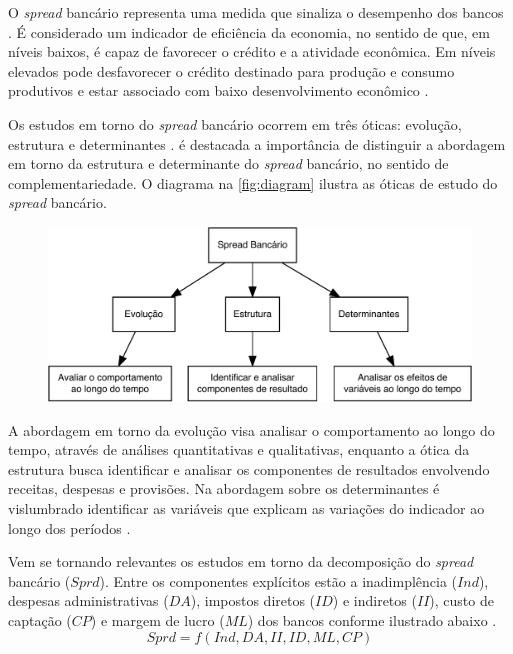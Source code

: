 \documentclass[12pt,12pt,openright,oneside,a4paper,chapter=TITLE,section=TITLE,subsection=TITLE,subsubsection=TITLE,english,french,spanish,portugues,sumario=tradicional]{abntex2}
\begin{document}
O \emph{spread} bancário representa uma medida que sinaliza o desempenho dos bancos \cite{levine:1997}. É considerado um indicador de eficiência da economia, no sentido de que, em níveis baixos, é capaz de favorecer o crédito e a atividade econômica. Em níveis elevados pode desfavorecer o crédito destinado para produção e consumo produtivos e estar associado com baixo desenvolvimento econômico \cite{WB:2005}.

Os estudos em torno do \emph{spread} bancário ocorrem em três óticas: evolução,
estrutura e determinantes \cite{dick:1999}. \textcite{dick:1999} é
destacada a importância de distinguir a abordagem em torno da estrutura e
determinante do \emph{spread} bancário, no sentido de complementariedade. O diagrama
na \autoref{fig:diagram} ilustra as óticas de estudo do \emph{spread} bancário.

\begin{figure}

\begin{center}\includegraphics{12-exportedfigures/diagram.spread.otic-1} \end{center}
\label{fig:diagrama}
\end{figure}

A abordagem em torno da evolução visa analisar o comportamento ao longo do
tempo, através de análises quantitativas e qualitativas, enquanto a ótica da
estrutura busca identificar e analisar os componentes de resultados envolvendo
receitas, despesas e provisões. Na abordagem sobre os determinantes é
vislumbrado identificar as variáveis que explicam as variações do indicador ao
longo dos períodos \cite{dick:1999}.

Vem se tornando relevantes os estudos em torno da decomposição do \emph{spread} bancário (\(Sprd\)). Entre os componentes explícitos estão a inadimplência (\(Ind\)), despesas administrativas (\(DA\)), impostos diretos (\(ID\)) e indiretos (\(II\)), custo de captação (\(CP\)) e margem de lucro (\(ML\)) dos bancos conforme ilustrado abaixo \cite{BCB:2000}.
\[
Sprd=f(Ind, DA, II, ID, ML, CP)
\]
\end{document}
